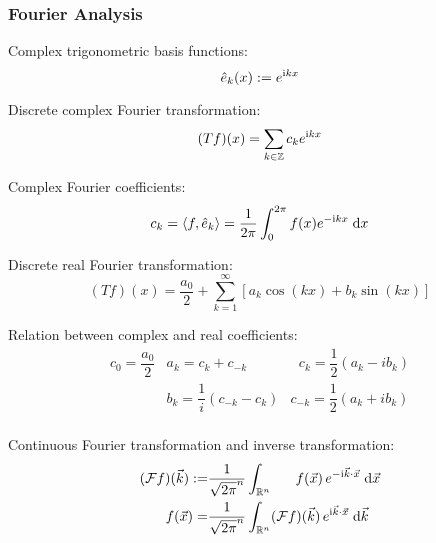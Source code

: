		\subsubsection{Fourier Analysis}
			\noindent
			Complex trigonometric basis functions:
			\begin{equation}
				\hat{e}_k(x):=e^{\mathrm{i} kx}
			\end{equation}

			\noindent
			Discrete complex Fourier transformation:
			\begin{equation}
				(Tf)(x)=\sum_{k\in\mathbb{Z}}c_k e^{\mathrm{i} kx}
			\end{equation}

			\noindent
			Complex Fourier coefficients:
			\begin{equation}
				c_k = \left<f,\hat{e}_k\right>=\frac{1}{2\pi}\int_0^{2\pi}f(x)e^{-\mathrm{i} kx}\;\dd x
			\end{equation}

			\noindent
			Discrete real Fourier transformation:
			\begin{equation}
				(Tf)(x)=\frac{a_0}{2}+\sum_{k=1}^{\infty}\left[a_k \cos(kx) + b_k \sin(kx) \right]
			\end{equation}

			\noindent
			Relation between complex and real coefficients:
			\begin{equation}
				\begin{array}{clc}
					c_0 = \dfrac{a_0}{2} & a_k = c_k+c_{-k} & \phantom{_{-}}c_k = \dfrac{1}{2}\left(a_k-ib_k\right) \\ [6pt]
					& b_k = \dfrac{1}{i}\left(c_{-k}-c_{k}\right) & c_{-k} = \dfrac{1}{2}\left(a_k+ib_k\right) \\
				\end{array}
			\end{equation}

			\noindent
			Continuous Fourier transformation and inverse transformation:
			\begin{equation}
				\begin{aligned}
					(\mathcal{F}f)(\vec{k}) :=& \frac{1}{\sqrt{2\pi}^n}\int_{\mathbb{R}^n} \phantom{(\mathcal{F})}f(\vec{x})\, e^{-\i\vec{k}\cdot\vec{x}}\;\dd\vec{x} \\
					\phantom{(\mathcal{F})}f(\vec{x}) =& \frac{1}{\sqrt{2\pi}^n}\int_{\mathbb{R}^n} (\mathcal{F}f)(\vec{k}) \,e^{\i\vec{k}\cdot\vec{x}}\;\dd \vec{k} \\
				\end{aligned}
			\end{equation}

